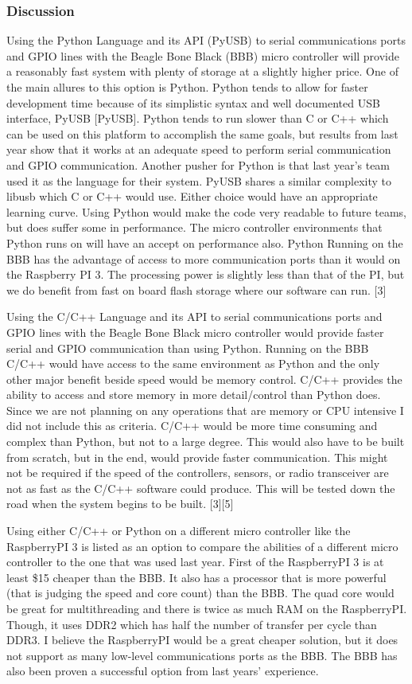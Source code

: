 \documentclass[10pt,draftclsnofoot,onecolumn,retainorgcmds]{IEEEtran}
\begin{document}
\subsubsection{Discussion}
Using the Python Language and its API (PyUSB) to serial communications ports and GPIO lines with the Beagle Bone Black (BBB) micro controller will provide a reasonably fast system with plenty of storage at a slightly higher price. One of the main allures to this option is Python. Python tends to allow for faster development time because of its simplistic syntax and well documented USB interface, PyUSB [PyUSB]. Python tends to run slower than C or C++ which can be used on this platform to accomplish the same goals, but results from last year show that it works at an adequate speed to perform serial communication and GPIO communication. Another pusher for Python is that last year’s team used it as the language for their system. PyUSB shares a similar complexity to libusb which C or C++ would use. Either choice would have an appropriate learning curve. Using Python would make the code very readable to future teams, but does suffer some in performance. The micro controller environments that Python runs on will have an accept on performance also. Python Running on the BBB has the advantage of access to more communication ports than it would on the Raspberry PI 3. The processing power is slightly less than that of the PI, but we do benefit from fast on board flash storage where our software can run. [3]\par
Using the C/C++ Language and its API to serial communications ports and GPIO lines with the Beagle Bone Black micro controller would provide faster serial and GPIO communication than using Python. Running on the BBB C/C++ would have access to the same environment as Python and the only other major benefit beside speed would be memory control. C/C++ provides the ability to access and store memory in more detail/control than Python does. Since we are not planning on any operations that are memory or CPU intensive I did not include this as criteria. C/C++ would be more time consuming and complex than Python, but not to a large degree. This would also have to be built from scratch, but in the end, would provide faster communication. This might not be required if the speed of the controllers, sensors, or radio transceiver are not as fast as the C/C++ software could produce. This will be tested down the road when the system begins to be built. [3][5]\par
Using either C/C++ or Python on a different micro controller like the RaspberryPI 3 is listed as an option to compare the abilities of a different micro controller to the one that was used last year. First of the RaspberryPI 3 is at least \$15 cheaper than the BBB. It also has a processor that is more powerful (that is judging the speed and core count) than the BBB. The quad core would be great for multithreading and there is twice as much RAM on the RaspberryPI. Though, it uses DDR2 which has half	the number of transfer per cycle than DDR3. I believe the RaspberryPI would be a great cheaper solution, but it does not support as many low-level communications ports as the BBB. The BBB has also been proven a successful option from last years’ experience.\\
\end{document}
